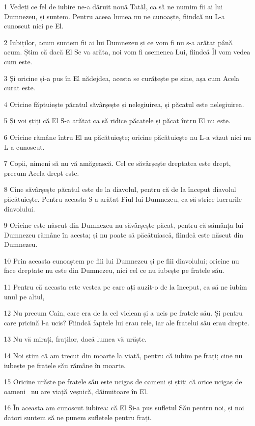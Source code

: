 \par 1 Vedeți ce fel de iubire ne-a dăruit nouă Tatăl, ca să ne numim fii ai lui Dumnezeu, și suntem. Pentru aceea lumea nu ne cunoaște, fiindcă nu L-a cunoscut nici pe El.
\par 2 Iubiților, acum suntem fii ai lui Dumnezeu și ce vom fi nu s-a arătat până acum. Știm că dacă El Se va arăta, noi vom fi asemenea Lui, fiindcă Îl vom vedea cum este.
\par 3 Și oricine și-a pus în El nădejdea, acesta se curățește pe sine, așa cum Acela curat este.
\par 4 Oricine făptuiește păcatul săvârșește și nelegiuirea, și păcatul este nelegiuirea.
\par 5 Și voi știți că El S-a arătat ca să ridice păcatele și păcat întru El nu este.
\par 6 Oricine rămâne întru El nu păcătuiește; oricine păcătuiește nu L-a văzut nici nu L-a cunoscut.
\par 7 Copii, nimeni să nu vă amăgească. Cel ce săvârșește dreptatea este drept, precum Acela drept este.
\par 8 Cine săvârșește păcatul este de la diavolul, pentru că de la început diavolul păcătuiește. Pentru aceasta S-a arătat Fiul lui Dumnezeu, ca să strice lucrurile diavolului.
\par 9 Oricine este născut din Dumnezeu nu săvârșește păcat, pentru că sămânța lui Dumnezeu rămâne în acesta; și nu poate să păcătuiască, fiindcă este născut din Dumnezeu.
\par 10 Prin aceasta cunoaștem pe fiii lui Dumnezeu și pe fiii diavolului; oricine nu face dreptate nu este din Dumnezeu, nici cel ce nu iubește pe fratele său.
\par 11 Pentru că aceasta este vestea pe care ați auzit-o de la început, ca să ne iubim unul pe altul,
\par 12 Nu precum Cain, care era de la cel viclean și a ucis pe fratele său. Și pentru care pricină l-a ucis? Fiindcă faptele lui erau rele, iar ale fratelui său erau drepte.
\par 13 Nu vă mirați, fraților, dacă lumea vă urăște.
\par 14 Noi știm că am trecut din moarte la viață, pentru că iubim pe frați; cine nu iubește pe fratele său rămâne în moarte.
\par 15 Oricine urăște pe fratele său este ucigaș de oameni și știți că orice ucigaș de oameni  nu are viață veșnică, dăinuitoare în El.
\par 16 În aceasta am cunoscut iubirea: că El Și-a pus sufletul Său pentru noi, și noi datori suntem să ne punem sufletele pentru frați.

